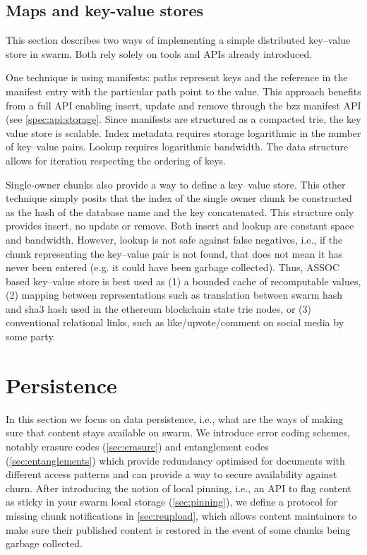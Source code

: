 \subsection{Maps and key-value stores}\label{sec:maps}

This section describes two ways of implementing a simple distributed key--value store in swarm. Both rely solely on tools and APIs  already introduced.

One technique is using manifests: paths represent keys and the reference in the manifest entry with the particular path point to  the  value. This approach benefits from a full API enabling insert, update and remove through the bzz manifest API (see \ref{spec:api:storage}. Since manifests are structured as a compacted trie, the key value store is scalable. Index metadata requires storage logarithmic in the number of key--value pairs. Lookup requires logarithmic bandwidth. The data structure allows for iteration respecting the ordering of keys. 

Single-owner chunks also provide a way to define a key--value store. 
This other technique simply posits that the index of the single owner chunk be constructed as the hash of the database name and the key concatenated. This structure only provides insert, no update or remove. Both insert and lookup are constant  space and bandwidth. However,  lookup is not safe against false negatives, i.e., if the chunk representing the key--value pair is not found,  that does not mean it has never been entered (e.g. it could have been garbage collected). Thus, ASSOC based key--value store    is best used as (1) a bounded cache of recomputable values, (2) mapping between representations such  as translation between swarm hash and sha3 hash used in the ethereum blockchain state trie nodes, or (3) conventional relational links, such as like/upvote/comment on social media by some party. 


\section{Persistence}\label{sec:persistence}

In this section we focus on data persistence, i.e., what are the ways of making sure that content stays available on swarm. 
We introduce error coding schemes, notably erasure codes (\ref{sec:erasure}) and entanglement codes (\ref{sec:entanglements}) which provide redundancy optimised for documents with different access patterns and can provide a way to secure availability against churn. 
After introducing the notion of local pinning, i.e., an API to flag content as sticky in your swarm local storage (\ref{sec:pinning}), we define a protocol for missing chunk notifications in \ref{sec:reupload}, which allows content maintainers to make sure their published content is restored in the event of some chunks being garbage collected.

